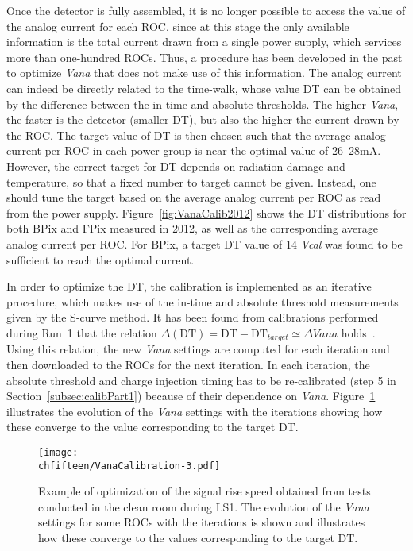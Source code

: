 Once the detector is fully assembled, it is no longer possible to access the value of the analog current for each ROC, since at this stage the only available information is the total current drawn from a single power supply, which services more than one-hundred ROCs. Thus, a procedure has been developed in the past to optimize \textit{Vana} that does not make use of this information.
The analog current can indeed be directly related to the time-walk, whose value DT can be obtained by the difference between the in-time and absolute thresholds.
The higher \textit{Vana}, the faster is the detector (smaller DT), but also the higher the current drawn by the ROC.
The target value of DT is then chosen such that the average analog current per ROC in each power group is near the optimal value of 26--28\unit{mA}.
However, the correct target for DT depends on radiation damage and temperature, so that a fixed number to target cannot be given.
Instead, one should tune the target based on the average analog current per ROC as read from the power supply.
Figure~\ref{fig:VanaCalib2012} shows the DT distributions for both BPix and FPix measured in 2012, as well as the corresponding average analog current per ROC.
For BPix, a target DT value of 14 \textit{Vcal} was found to be sufficient to reach the optimal current.

In order to optimize the DT, the calibration is implemented as an iterative procedure, which makes use of the in-time and absolute threshold measurements given by the S-curve method.
It has been found from calibrations performed during Run~1 that the relation $\Delta(\mathrm{DT}) = \mathrm{DT} - \mathrm{DT}_{target} \simeq \Delta{Vana}$ holds~\cite{Gaz:2013pja}.
Using this relation, the new \textit{Vana} settings are computed for each iteration and then downloaded to the ROCs for the next iteration. In each iteration, the absolute threshold and charge injection timing has to be re-calibrated (step 5 in Section~\ref{subsec:calibPart1}) because of their dependence on \textit{Vana}. 
Figure~\ref{fig:VanaCalib} illustrates the evolution of the \textit{Vana} settings with the iterations showing how these converge to the value corresponding to the target DT.

\begin{figure}[!htb]
\begin{center}
 \texttt{[image: \\chfifteen/VanaCalibration-3.pdf]}
 \end{center}
 \caption{Example of optimization of the signal rise speed obtained from tests conducted in the clean room during LS1. The evolution of the \textit{Vana} settings for some ROCs with the iterations is shown and illustrates how these converge to the values corresponding to the target DT. }
 \label{fig:VanaCalib}
\end{figure}

